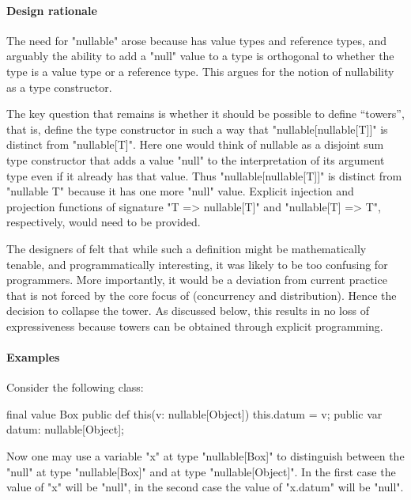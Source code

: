 \paragraph{Design rationale}

The need for \xcd"nullable" arose because \Xten{} has value types and
reference types, and arguably the ability to add a \xcd"null" value to
a type is orthogonal to whether the type is a value type or a
reference type. This argues for the notion of nullability as a type
constructor.

The key question that remains is whether it should be possible to
define ``towers'', that is, define the type constructor in such a way
that \xcd"nullable[nullable[T]]" is distinct from \xcd"nullable[T]". Here
one would think of nullable as a disjoint sum type constructor that
adds a value \xcd"null" to the interpretation of its argument type
even if it already has that value. Thus \xcd"nullable[nullable[T]]" is
distinct from \xcd"nullable T" because it has one more \xcd"null"
value. Explicit injection and projection functions of signature
\xcd"T => nullable[T]" and \xcd"nullable[T] => T", respectively,
would need to be provided.

The designers of \Xten{} felt that while such a definition might be
mathematically tenable, and programmatically interesting, it was
likely to be too confusing for programmers. More importantly, it would
be a deviation from current practice that is not forced by the core
focus of \Xten{} (concurrency and distribution). Hence the decision to
collapse the tower.  As discussed below, this results in no loss of
expressiveness because towers can be obtained through explicit
programming.

\paragraph{Examples}

Consider the following class:

\begin{xten}
final value Box { 
  public def this(v: nullable[Object]) { this.datum = v; }
  public var datum: nullable[Object];
}
\end{xten}

Now one may use a variable \xcd"x" at type \xcd"nullable[Box]" to
distinguish between the \xcd"null" at type \xcd"nullable[Box]" and at type
\xcd"nullable[Object]". In the first case the value
of \xcd"x" will be \xcd"null", in the second case the value of \xcd"x.datum"
will be \xcd"null".

